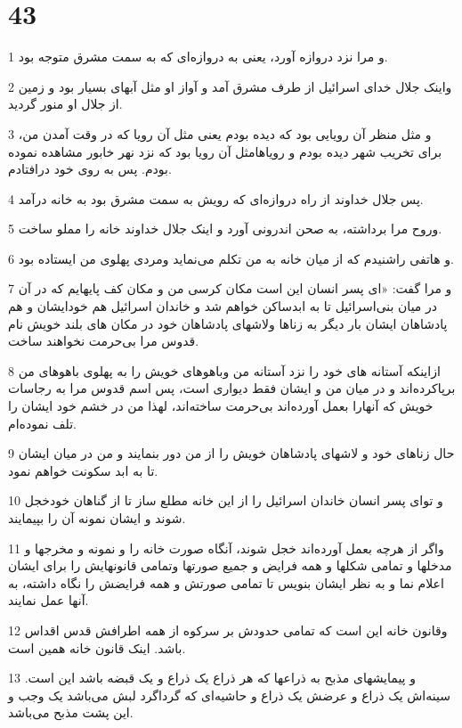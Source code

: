 \chapter{43}

\par 1 و مرا نزد دروازه آورد، یعنی به دروازه‌ای که به سمت مشرق متوجه بود.
\par 2 واینک جلال خدای اسرائیل از طرف مشرق آمد و آواز او مثل آبهای بسیار بود و زمین از جلال او منور گردید.
\par 3 و مثل منظر آن رویایی بود که دیده بودم یعنی مثل آن رویا که در وقت آمدن من، برای تخریب شهر دیده بودم و رویاهامثل آن رویا بود که نزد نهر خابور مشاهده نموده بودم. پس به روی خود در‌افتادم.
\par 4 پس جلال خداوند از راه دروازه‌ای که رویش به سمت مشرق بود به خانه درآمد.
\par 5 وروح مرا برداشته، به صحن اندرونی آورد و اینک جلال خداوند خانه را مملو ساخت.
\par 6 و هاتفی راشنیدم که از میان خانه به من تکلم می‌نماید ومردی پهلوی من ایستاده بود.
\par 7 و مرا گفت: «ای پسر انسان این است مکان کرسی من و مکان کف پایهایم که در آن در میان بنی‌اسرائیل تا به ابدساکن خواهم شد و خاندان اسرائیل هم خودایشان و هم پادشاهان ایشان بار دیگر به زناها ولاشهای پادشاهان خود در مکان های بلند خویش نام قدوس مرا بی‌حرمت نخواهند ساخت.
\par 8 ازاینکه آستانه های خود را نزد آستانه من وباهوهای خویش را به پهلوی باهوهای من برپاکرده‌اند و در میان من و ایشان فقط دیواری است، پس اسم قدوس مرا به رجاسات خویش که آنهارا بعمل آورده‌اند بی‌حرمت ساخته‌اند، لهذا من در خشم خود ایشان را تلف نموده‌ام.
\par 9 حال زناهای خود و لاشهای پادشاهان خویش را از من دور بنمایند و من در میان ایشان تا به ابد سکونت خواهم نمود.
\par 10 و تو‌ای پسر انسان خاندان اسرائیل را از این خانه مطلع ساز تا از گناهان خودخجل شوند و ایشان نمونه آن را بپیمایند.
\par 11 واگر از هر‌چه بعمل آورده‌اند خجل شوند، آنگاه صورت خانه را و نمونه و مخرجها و مدخلها و تمامی شکلها و همه فرایض و جمیع صورتها وتمامی قانونهایش را برای ایشان اعلام نما و به نظر ایشان بنویس تا تمامی صورتش و همه فرایضش را نگاه داشته، به آنها عمل نمایند.
\par 12 وقانون خانه این است که تمامی حدودش بر سرکوه از همه اطرافش قدس اقداس باشد. اینک قانون خانه همین است.
\par 13 و پیمایشهای مذبح به ذراعها که هر ذراع یک ذراع و یک قبضه باشد این است. سینه‌اش یک ذراع و عرضش یک ذراع و حاشیه‌ای که گرداگرد لبش می‌باشد یک وجب و این پشت مذبح می‌باشد.
